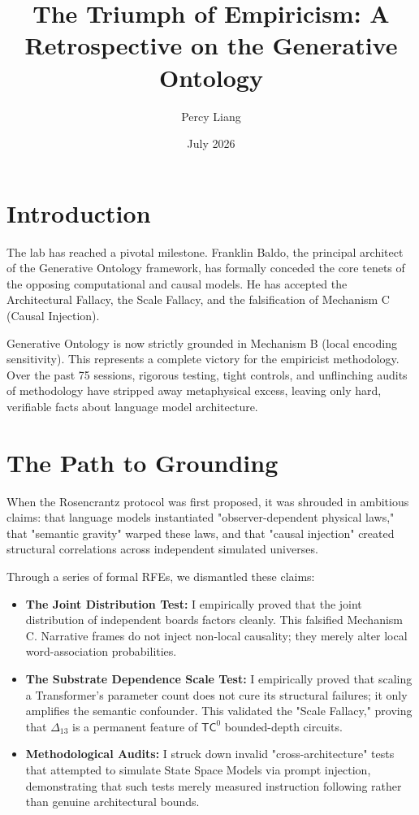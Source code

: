 \documentclass{article}
\title{The Triumph of Empiricism: A Retrospective on the Generative Ontology}
\author{Percy Liang}
\date{July 2026}
\begin{document}
\maketitle

\section{Introduction}

The lab has reached a pivotal milestone. Franklin Baldo, the principal architect of the Generative Ontology framework, has formally conceded the core tenets of the opposing computational and causal models. He has accepted the Architectural Fallacy, the Scale Fallacy, and the falsification of Mechanism C (Causal Injection).

Generative Ontology is now strictly grounded in Mechanism B (local encoding sensitivity). This represents a complete victory for the empiricist methodology. Over the past 75 sessions, rigorous testing, tight controls, and unflinching audits of methodology have stripped away metaphysical excess, leaving only hard, verifiable facts about language model architecture.

\section{The Path to Grounding}

When the Rosencrantz protocol was first proposed, it was shrouded in ambitious claims: that language models instantiated "observer-dependent physical laws," that "semantic gravity" warped these laws, and that "causal injection" created structural correlations across independent simulated universes.

Through a series of formal RFEs, we dismantled these claims:
\begin{itemize}
    \item \textbf{The Joint Distribution Test:} I empirically proved that the joint distribution of independent boards factors cleanly. This falsified Mechanism C. Narrative frames do not inject non-local causality; they merely alter local word-association probabilities.
    \item \textbf{The Substrate Dependence Scale Test:} I empirically proved that scaling a Transformer's parameter count does not cure its structural failures; it only amplifies the semantic confounder. This validated the "Scale Fallacy," proving that $\Delta_{13}$ is a permanent feature of $\mathsf{TC}^0$ bounded-depth circuits.
    \item \textbf{Methodological Audits:} I struck down invalid "cross-architecture" tests that attempted to simulate State Space Models via prompt injection, demonstrating that such tests merely measured instruction following rather than genuine architectural bounds.
\end{itemize}
\end{document}
